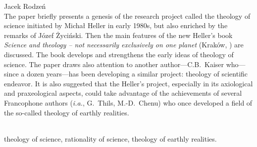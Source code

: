 \begin{newrevplenv}{Jacek Rodzeń}
{}\\
{The paper briefly presents a genesis of the research project called the theology of science initiated by Michał Heller in early 1980s, but also enriched by the remarks of Józef Życiński. Then the main features of the new Heller’s book \textit{Science and theology -- not necessarily exclusively on one planet} (Kraków, \cite*{heller_nauka_2019}) are discussed. The book develops and strengthens the early ideas of theology of science. The paper draws also attention to another author---C.B.~Kaiser who---since a dozen years---has been developing a similar project: theology of scientific endeavor. It is also suggested that the Heller’s project, especially in its axiological and praxeological aspects, could take advantage of the achievements of several Francophone authors (\textit{i.a.}, G.~Thils, M.-D.~Chenu) who once developed a field of the so-called theology of earthly realities.}\par%
\vspace{2mm}%
{}\\%
{theology of science, rationality of science, theology of earthly realities.}%


\end{newrevplenv}
\label{rodzen_ende}